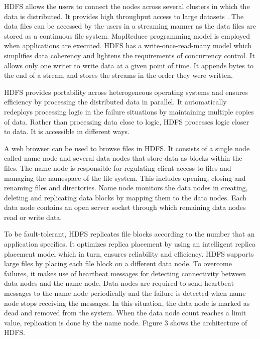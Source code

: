 \documentclass[9pt,twocolumn,twoside]{../../styles/osajnl}
\begin{document}
HDFS allows the users to connect the nodes across several clusters in
which the data is distributed. It provides high throughput access to
large datasets \cite{hdfsIbm}. The data files can be accessed by the
users in a streaming manner as the data files are stored as a
continuous file system. MapReduce programming model is employed when
applications are executed. HDFS has a write-once-read-many model which
simplifies data coherency and lightens the requirements of concurrency
control. It allows only one writer to write data at a given point of
time. It appends bytes to the end of a stream and stores the streams
in the order they were written.

HDFS provides portability across heterogeneous operating systems and
ensures efficiency by processing the distributed data in parallel. It
automatically redeploys processing logic in the failure situations by
maintaining multiple copies of data. Rather than processing data close
to logic, HDFS processes logic closer to data. It is accessible in
different ways. 

A web browser can be used to browse files in HDFS. It consists of a
single node called name node and several data nodes that store data as
blocks within the files. The name node is responsible for regulating
client access to files and managing the namespace of the file
system. This includes opening, closing and renaming files and
directories. Name node monitors the data nodes in creating, deleting
and replicating data blocks by mapping them to the data nodes. Each
data node contains an open server socket through which remaining data
nodes read or write data.

To be fault-tolerant, HDFS replicates file blocks according to the
number that an application specifies. It optimizes replica placement
by using an intelligent replica placement model which in turn, ensures
reliability and efficiency. HDFS supports large files by placing each
file block on a different data node. To overcome failures, it makes
use of heartbeat messages for detecting connectivity between data
nodes and the name node. Data nodes are required to send heartbeat
messages to the name node periodically and the failure is detected
when name node stops receiving the messages. In this situation, the
data node is marked as dead and removed from the system. When the data
node count reaches a limit value, replication is done by the name
node. Figure 3 shows the architecture of HDFS.
\end{document}
